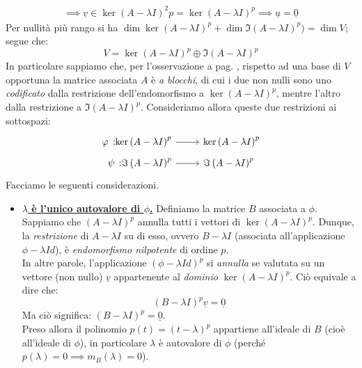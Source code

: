 \begin{demonstration}
\begin{enumerate}[label=\Roman*]
\begin{equation*}
\begin{array}{l}
	\implies \underline{v}\in\ker\left(A-\lambda I\right)^2p=\ker\left(A-\lambda I\right)^p\implies \underline{u}=\underline{0}
\end{array}
\end{equation*}
Per nullità più rango si ha $\dim \ker \left(A-\lambda I\right)^p + \dim \Im\left(A-\lambda I\right)^p)=\dim V$; segue che:
\begin{equation}
V=\ker\left(A-\lambda I\right)^p\oplus\Im \left(A-\lambda I\right)^p
\end{equation}
In particolare sappiamo che, per l'osservazione a pag. \pageref{observejordan}, rispetto ad una base di $V$ opportuna la matrice associata $A$ è \textit{a blocchi}, di cui i due non nulli sono uno \textit{codificato} dalla restrizione dell'endomorfismo a $\ker\left(A-\lambda I\right)^p$, mentre l'altro dalla restrizione a $\Im \left(A-\lambda I\right)^p$. Consideriamo allora queste due restrizioni ai sottospazi:
\begin{gather*}
\funz{\phi}{\ker\left(A-\lambda I\right)^p}{\ker\left(A-\lambda I\right)^p}\\
\funz{\psi}{\Im\left(A-\lambda I\right)^p}{\Im\left(A-\lambda I\right)^p}
\end{gather*}
Facciamo le seguenti considerazioni.
\begin{itemize}
\item \textbf{\underline{$\lambda$ è l'unico autovalore di $\phi$.}} Definiamo la matrice $B$ associata a $\phi$. Sappiamo che $\left(A-\lambda I\right)^p$ annulla tutti i vettori di $\ker\left(A-\lambda I\right)^p$. Dunque, la \textit{restrizione} di $A-\lambda I$ su di esso, ovvero $B-\lambda I$ (associata all'applicazione $\phi-\lambda Id$), è \textit{endomorfismo nilpotente} di ordine $p$.\\
In altre parole, l'applicazione $\left(\phi-\lambda Id\right)^p$ si \textit{annulla} se valutata su un vettore (non nullo) $\underline{v}$ appartenente al \textit{dominio} $\ker\left(A-\lambda I\right)^p$. Ciò equivale a dire che:
\begin{equation*}
\left(B-\lambda I\right)^p\underline{v}=\underline{0}
\end{equation*}
Ma ciò significa: $\left(B-\lambda I\right)^p=\underline{0}$.\\
Preso allora il polinomio $p\left(t\right)=\left(t-\lambda\right)^p$ appartiene all'ideale di $B$ (cioè all'ideale di $\phi$), in particolare $\lambda$ è autovalore di $\phi$ (perché $p\left(\lambda\right)=0\implies m_B\left(\lambda\right)=0$).\\

\end{itemize}
\end{enumerate}
\end{demonstration}
